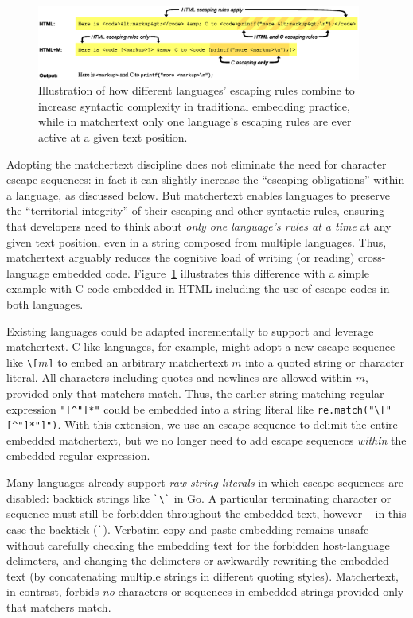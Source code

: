 \begin{figure}[t]
\begin{center}
\includegraphics[width=0.95\textwidth]{fig/territorial-integrity.eps}
\end{center}
\caption{Illustration of how different languages' escaping rules
	combine to increase syntactic complexity
	in traditional embedding practice,
	while in matchertext only one language's escaping rules
	are ever active at a given text position.}
\label{fig:territorial-integrity}
\end{figure}

Adopting the matchertext discipline
does not eliminate the need for character escape sequences:
in fact it can slightly increase the ``escaping obligations''
within a language, as discussed below.
But matchertext enables languages to preserve
the ``territorial integrity'' of their escaping and other syntactic rules,
ensuring that developers need to think about
\emph{only one language's rules at a time}
at any given text position,
even in a string composed from multiple languages.
Thus, matchertext arguably reduces the cognitive load
of writing (or reading) cross-language embedded code.
Figure~\ref{fig:territorial-integrity} illustrates this difference
with a simple example with C code embedded in HTML
including the use of escape codes in both languages.

Existing languages could be adapted incrementally
to support and leverage matchertext.
C-like languages, for example,
might adopt a new escape sequence like \verb|\[|$m$\verb|]|
to embed an arbitrary matchertext $m$
into a quoted string or character literal.
All characters including quotes and newlines
are allowed within $m$,
provided only that matchers match.
Thus,
the earlier string-matching regular expression
\verb|"[^"]*"|
could be embedded into a string literal
like \verb|re.match("\["[^"]*"]")|.
With this extension, we use an escape sequence
to delimit the entire embedded matchertext,
but we no longer need to add escape sequences
\emph{within} the embedded regular expression.

Many languages already support \emph{raw string literals}
in which escape sequences are disabled:
\eg backtick strings like \verb|`\`| in Go.
A particular terminating character or sequence
must still be forbidden throughout the embedded text,
however -- in this case the backtick (\verb|`|).
Verbatim copy-and-paste embedding remains unsafe
without carefully checking the embedding text
for the forbidden host-language delimeters,
and changing the delimeters or awkwardly rewriting the embedded text
(\eg by concatenating multiple strings in different quoting styles).
Matchertext, in contrast, forbids \emph{no} characters or sequences
in embedded strings provided only that matchers match.

